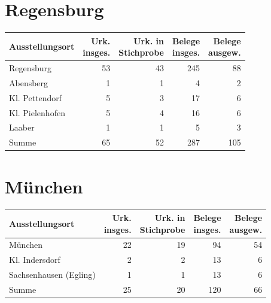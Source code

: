 \section{Regensburg}

\begin{tabularx}{\linewidth}{X r r r r}
\toprule
Ausstellungsort
	& \makecell{Urk.\\ insges.}
	& \makecell{Urk. in\\ Stichprobe}
	& \makecell{Belege\\ insges.}
	& \makecell{Belege\\ ausgew.}
	\\
\midrule

Regensburg
	& 53
	& 43
	& 245
	& 88
	\\

Abensberg
	& 1
	& 1
	& 4
	& 2
	\\

Kl. Pettendorf
	& 5
	& 3
	& 17
	& 6
	\\

Kl. Pielenhofen
	& 5
	& 4
	& 16
	& 6
	\\

Laaber
	& 1
	& 1
	& 5
	& 3
	\\

\midrule

Summe
	& 65
	& 52
	& 287
	& 105
	\\

\bottomrule
\end{tabularx}

\section{München}

\begin{tabularx}{\linewidth}{X r r r r}
\toprule
Ausstellungsort
	& \makecell{Urk.\\ insges.}
	& \makecell{Urk. in\\ Stichprobe}
	& \makecell{Belege\\ insges.}
	& \makecell{Belege\\ ausgew.}
	\\
\midrule

München
	& 22
	& 19
	& 94
	& 54
	\\

Kl. Indersdorf
	& 2
	& 2
	& 13
	& 6
	\\

Sachsenhausen (Egling)
	& 1
	& 1
	& 13
	& 6
	\\

\midrule

Summe
	& 25
	& 20
	& 120
	& 66
	\\

\bottomrule
\end{tabularx}

